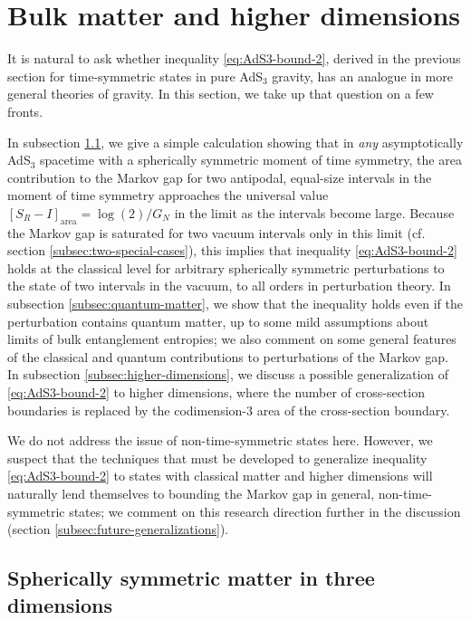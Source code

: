 \documentclass[a4paper,11pt]{article}
\begin{document}
\section{Bulk matter and higher dimensions}
\label{sec:generalizations}

It is natural to ask whether inequality \eqref{eq:AdS3-bound-2}, derived in the previous section for time-symmetric states in pure AdS$_3$ gravity, has an analogue in more general theories of gravity. In this section, we take up that question on a few fronts.

In subsection \ref{subsec:spherical-matter}, we give a simple calculation showing that in \emph{any} asymptotically AdS$_3$ spacetime with a spherically symmetric moment of time symmetry, the area contribution to the Markov gap for two antipodal, equal-size intervals in the moment of time symmetry approaches the universal value $[S_R - I]_{\text{area}} = \log(2) / G_N$ in the limit as the intervals become large. Because the Markov gap is saturated for two vacuum intervals only in this limit (cf. section \ref{subsec:two-special-cases}), this implies that inequality \eqref{eq:AdS3-bound-2} holds at the classical level for arbitrary spherically symmetric perturbations to the state of two intervals in the vacuum, to all orders in perturbation theory. In subsection \ref{subsec:quantum-matter}, we show that the inequality holds even if the perturbation contains quantum matter, up to some mild assumptions about limits of bulk entanglement entropies; we also comment on some general features of the classical and quantum contributions to perturbations of the Markov gap. In subsection \ref{subsec:higher-dimensions}, we discuss a possible generalization of \eqref{eq:AdS3-bound-2} to higher dimensions, where the number of cross-section boundaries is replaced by the codimension-$3$ area of the cross-section boundary.

We do not address the issue of non-time-symmetric states here. However, we suspect that the techniques that must be developed to generalize inequality \eqref{eq:AdS3-bound-2} to states with classical matter and higher dimensions will naturally lend themselves to bounding the Markov gap in general, non-time-symmetric states; we comment on this research direction further in the discussion (section \ref{subsec:future-generalizations}).

\subsection{Spherically symmetric matter in three dimensions}
\label{subsec:spherical-matter}
\end{document}
